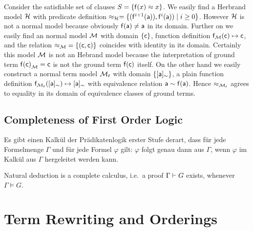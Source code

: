 \begin{example}
	Consider the satisfiable set of clauses \( S = \{ \mathsf{f}(x) \approx x \} \).
	We easily find a Herbrand model \( \mathcal{H} \) with
	predicate definition \( \approx_{\mathcal{H}} = \{ (\mathsf{f}^{i+1}(\mathsf{a})), \mathsf{f}^{i}(\mathsf{a})) \mid i\geq 0  \}  \).
	However \( \mathcal{H} \) is not a normal model because obviously \( \mathsf{f}(\mathsf{a})\neq\mathsf{a} \) in its domain.
	Further on we easily find an normal model \( \mathcal{M} \)
	with domain \( \{ \mathsf{c} \} \), function definition \( \mathsf{f}_{\mathcal{M}}(\mathsf{c}) \mapsto \mathsf{c} \),
	and the relation \( {\approx_{\mathcal{M}}} = \{ (\mathsf{c},\mathsf{c})\} \) coincides with identity in its domain.
	Certainly this model \( \mathcal{M} \) is not an Hebrand model
	because the interpretation of ground term \( {\mathsf{f}(\mathsf{c})}_{\mathcal{M}} = \mathsf{c} \) is not the ground term \( \mathsf{f}(\mathsf{c}) \) itself.
	On the other hand we easily construct a normal term model \( \mathcal{M}_t \) with domain \( \{ [\mathsf{a}]_\sim\} \),
	a plain function definition
	\( \mathsf{f}_{\mathcal{M}_t}([\mathsf{a}]_\sim) \mapsto [\mathsf{a}]_\sim \)
	with equivalence relation
	\( \mathsf{a} \sim \mathsf{f}(\mathsf{a}) \).
	Hence \( \approx_{\mathcal{M}_t} \) agrees to equality in its domain of equivalence classes of ground terms.
\end{example}


\subsection{Completeness of First Order Logic}

\begin{theorem}
	Es gibt einen Kalkül der Prädikatenlogik erster Stufe derart, dass für jede Formelmenge
\(\Gamma\) und für jede Formel
\( \varphi \) gilt:
\( \varphi \) folgt genau dann aus
\( \Gamma \), wenn
\( \varphi \) im Kalkül aus
\( \Gamma \)  hergeleitet werden kann.
\end{theorem}

\begin{theorem}
	Natural deduction is a complete calculus, i.e.~a proof \( \Gamma\vdash G \) exists,
	whenever \( \Gamma\models G \).
\end{theorem}


\section{Term Rewriting and Orderings}\label{sec:termrewriting}

